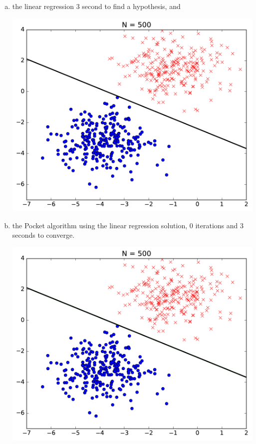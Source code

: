 \documentclass[a4paper]{article}
\begin{document}
\begin {description}
\begin{doublespace}
\begin{enumerate}[(a)]
\newpage
\item the linear regression $3$ second to find a hypothesis, and 
\begin{center}
\includegraphics[scale=0.5]{Trial_4/linear_regression.pdf}
\end{center}
\item  the Pocket algorithm using the linear regression solution, $0$ iterations and $3$ seconds to converge.
\begin{center}
\includegraphics[scale=0.5]{Trial_4/pocket_with_lr.pdf}
\end{center}
\end{enumerate}


\end{doublespace}
\end{description}
\end{document}

